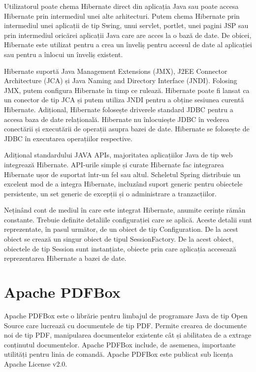 \documentclass[12pt]{book}
\begin{document}
Utilizatorul poate chema Hibernate direct din aplicația Java sau poate accesa Hibernate prin intermediul unei alte arhitecturi. Putem chema Hibernate prin intermediul unei aplicații de tip Swing, unui servlet, portlet, unei pagini JSP sau prin intermediul oricărei aplicații Java care are acces la o bază de date. De obicei, Hibernate este utilizat pentru a crea un înveliș pentru accesul de date al aplicației sau pentru a înlocui un înveliș existent.

Hibernate suportă Java Management Extensions (JMX), J2EE Connector Architecture (JCA) și Java Naming and Directory Interface (JNDI). Folosing JMX, putem configura Hibernate în timp ce rulează. Hibernate poate fi lansat ca un conector de tip JCA și putem utiliza JNDI pentru a obține sesiunea curentă Hibernate. Adițional, Hibernate folosește driverele standard JDBC pentru a accesa baza de date relațională. Hibernate nu înlocuiește JDBC în vederea conectării și executării de operații asupra bazei de date. Hibernate se folosește de JDBC în executarea operațiilor respective.

Adițional standardului JAVA APIs, majoritatea aplicațiilor Java de tip web integrează Hibernate. API-urile simple și curate Hibernate fac integrarea Hibernate ușor de suportat într-un fel sau altul. Scheletul Spring distribuie un excelent mod de a integra Hibernate, incluzând suport generic pentru obiectele persistente, un set generic de excepții și o administrare a tranzacțiilor.

Neținând cont de mediul în care este integrat Hibernate, anumite cerințe rămân constante. Trebuie definite detaliile configurației care se aplică. Aceste detalii sunt reprezentate, în pasul următor, de un obiect de tip Configuration. De la acest obiect se crează un singur obiect de tipul SessionFactory. De la acest obiect, obiectele de tip Session sunt instanțiate, obiecte prin care aplicația accesează reprezentarea Hibernate a bazei de date. \cite{BeginningHibernate}

\section{Apache PDFBox}

Apache PDFBox este o librărie pentru limbajul de programare Java de tip Open Source care lucrează cu documentele de tip PDF. Permite crearea de documente noi de tip PDF, manipularea documentelor existente cât și abilitatea de a extrage conținutul documentelor. Apache PDFBox include, de asemenea, importante utilități pentru linia de comandă. Apache PDFBox este publicat sub licența Apache License v2.0.\cite{PDFBoxOfficial}
\end{document}
